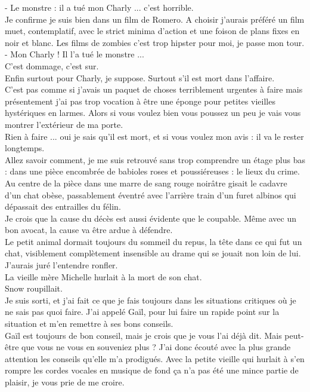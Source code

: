 - Le monstre : il a tué mon Charly ... c'est horrible. \\

Je confirme je suis bien dans un film de Romero. A choisir j'aurais préféré un film muet, contemplatif, avec le strict minima d'action et une foison de plans fixes en noir et blanc. Les films de zombies c'est trop hipster pour moi, je passe mon tour.\\

- Mon Charly ! Il l'a tué le monstre ... \\

C'est dommage, c'est sur.\\
Enfin surtout pour Charly, je suppose. Surtout s'il est mort dans l'affaire. \\
C'est pas comme si j'avais un paquet de choses terriblement urgentes à faire mais présentement j'ai pas trop vocation à être une éponge pour petites vieilles hystériques en larmes. Alors si vous voulez bien vous poussez un peu je vais vous montrer l'extérieur de ma porte.\\
Rien à faire ... oui je sais qu'il est mort, et si vous voulez mon avis : il va le rester longtemps. \\

Allez savoir comment, je me suis retrouvé sans trop comprendre un étage plus bas : dans une pièce encombrée de babioles roses et poussiéreuses : le lieux du crime. Au centre de la pièce dans une marre de sang rouge noirâtre gisait le cadavre d'un chat obèse, passablement éventré avec l'arrière train d'un furet albinos qui dépassait des entrailles du félin.\\
Je crois que la cause du décès est aussi évidente que le coupable. Même avec un bon avocat, la cause va être ardue à défendre. \\
Le petit animal dormait toujours du sommeil du repus, la tête dans ce qui fut un chat, visiblement complètement insensible au drame qui se jouait non loin de lui. J'aurais juré l'entendre ronfler.\\

La vieille mère Michelle hurlait à la mort de son chat.\\

Snow roupillait. \\

Je suis sorti, et j'ai fait ce que je fais toujours dans les situations critiques où je ne sais pas quoi faire. J'ai appelé Gaïl, pour lui faire un rapide point sur la situation et m'en remettre à ses bons conseils.\\
Gaïl est toujours de bon conseil, mais je crois que je vous l'ai déjà dit. Mais peut-être que vous ne vous en souveniez plus ? J'ai donc écouté avec la plus grande attention les conseils qu'elle m'a prodigués. Avec la petite vieille qui hurlait à s'en rompre les cordes vocales en musique de fond ça n'a pas été une mince partie de plaisir, je vous prie de me croire.\\

